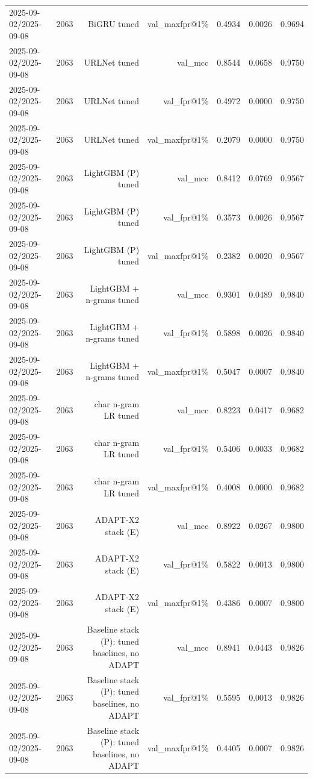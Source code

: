 \begin{table}[t]
\begin{tabular}{llrrrrr}
2025-09-02/2025-09-08 & 2063 & BiGRU tuned & val\_maxfpr@1\% & 0.4934 & 0.0026 & 0.9694 \\
2025-09-02/2025-09-08 & 2063 & URLNet tuned & val\_mcc & 0.8544 & 0.0658 & 0.9750 \\
2025-09-02/2025-09-08 & 2063 & URLNet tuned & val\_fpr@1\% & 0.4972 & 0.0000 & 0.9750 \\
2025-09-02/2025-09-08 & 2063 & URLNet tuned & val\_maxfpr@1\% & 0.2079 & 0.0000 & 0.9750 \\
2025-09-02/2025-09-08 & 2063 & LightGBM (P) tuned & val\_mcc & 0.8412 & 0.0769 & 0.9567 \\
2025-09-02/2025-09-08 & 2063 & LightGBM (P) tuned & val\_fpr@1\% & 0.3573 & 0.0026 & 0.9567 \\
2025-09-02/2025-09-08 & 2063 & LightGBM (P) tuned & val\_maxfpr@1\% & 0.2382 & 0.0020 & 0.9567 \\
2025-09-02/2025-09-08 & 2063 & LightGBM + n-grams tuned & val\_mcc & 0.9301 & 0.0489 & 0.9840 \\
2025-09-02/2025-09-08 & 2063 & LightGBM + n-grams tuned & val\_fpr@1\% & 0.5898 & 0.0026 & 0.9840 \\
2025-09-02/2025-09-08 & 2063 & LightGBM + n-grams tuned & val\_maxfpr@1\% & 0.5047 & 0.0007 & 0.9840 \\
2025-09-02/2025-09-08 & 2063 & char n-gram LR tuned & val\_mcc & 0.8223 & 0.0417 & 0.9682 \\
2025-09-02/2025-09-08 & 2063 & char n-gram LR tuned & val\_fpr@1\% & 0.5406 & 0.0033 & 0.9682 \\
2025-09-02/2025-09-08 & 2063 & char n-gram LR tuned & val\_maxfpr@1\% & 0.4008 & 0.0000 & 0.9682 \\
2025-09-02/2025-09-08 & 2063 & ADAPT-X2 stack (E) & val\_mcc & 0.8922 & 0.0267 & 0.9800 \\
2025-09-02/2025-09-08 & 2063 & ADAPT-X2 stack (E) & val\_fpr@1\% & 0.5822 & 0.0013 & 0.9800 \\
2025-09-02/2025-09-08 & 2063 & ADAPT-X2 stack (E) & val\_maxfpr@1\% & 0.4386 & 0.0007 & 0.9800 \\
2025-09-02/2025-09-08 & 2063 & Baseline stack (P): tuned baselines, no ADAPT & val\_mcc & 0.8941 & 0.0443 & 0.9826 \\
2025-09-02/2025-09-08 & 2063 & Baseline stack (P): tuned baselines, no ADAPT & val\_fpr@1\% & 0.5595 & 0.0013 & 0.9826 \\
2025-09-02/2025-09-08 & 2063 & Baseline stack (P): tuned baselines, no ADAPT & val\_maxfpr@1\% & 0.4405 & 0.0007 & 0.9826 \\

\end{tabular}
\end{table}
